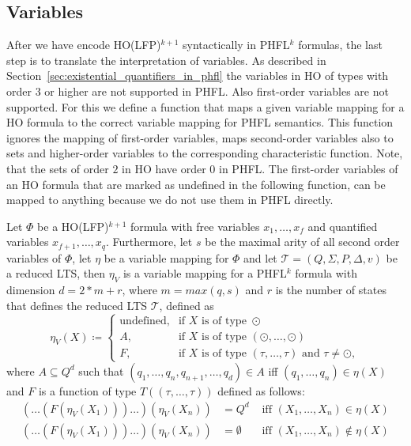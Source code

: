 \subsection{Variables}\label{subsec:lower_bounds_variables}

After we have encode HO(LFP)$^{k+1}$ syntactically in PHFL$^k$ formulas, the last step is to translate the 
interpretation of variables. As described in Section~\ref{sec:existential_quantifiers_in_phfl} the variables in HO of 
types with order $3$ or higher are not supported in PHFL. Also first-order variables are not supported. For this we 
define a function that maps a given variable mapping for a HO formula to the correct variable mapping for PHFL 
semantics. This function ignores the mapping of first-order variables, maps second-order variables also to sets and 
higher-order variables to the corresponding characteristic function. Note, that the sets of order $2$ in HO have order 
$0$ in PHFL. The first-order variables of an HO formula that are marked as undefined in the following function, can be 
mapped to anything because we do not use them in PHFL directly.

\begin{definition}
    \label{definition:lower_bound_variable_function}
    Let $\Phi$ be a HO(LFP)$^{k+1}$ formula with free variables $x_1, \dots, x_f$ and quantified variables $x_{f+1}, 
    \dots, x_q$. Furthermore, let $s$ be the maximal arity of all second order variables of $\Phi$,  let $\eta$ be a
    variable mapping for $\Phi$ and let $\mathcal{T} = (Q, \Sigma, P, \Delta, v)$ be a reduced LTS, then $\eta_V$ is a 
    variable mapping for a PHFL$^k$ formula with dimension $d = 2 * m + r$, where $m = max({q,
    s})$ and $r$ is the number of states that defines the reduced LTS $\mathcal{T}$, defined as
    \[\eta_V(X)\coloneqq
    \begin{cases}
        \text{undefined}, & \text{if } X \text{ is of type } \odot \\
        A,  & \text{if } X \text{ is of type } (\odot, \dots, \odot)\\
        F, & \text{if } X \text{ is of type } (\tau, \dots, \tau) \text{ and } \tau \neq \odot,
    \end{cases}\]
    where $A \subseteq Q^d$ such that $(q_1, \dots, q_n, q_{n + 1}, \dots, q_d) \in A$ iff $(q_1, \dots, q_n) \in
    \eta(X)$ and $F$ is a function of type $T((\tau, \dots, \tau))$ defined as follows:
    \begin{align*}
        (\dots(F(\eta_V(X_1)))\dots)(\eta_V(X_n)) &= Q^d &\text{ iff } (X_1, \dots, X_n) \in \eta(X)\\
        (\dots(F(\eta_V(X_1)))\dots)(\eta_V(X_n)) &= \emptyset &\text{ iff } (X_1, \dots, X_n)
        \not\in \eta(X)
    \end{align*}
\end{definition}

